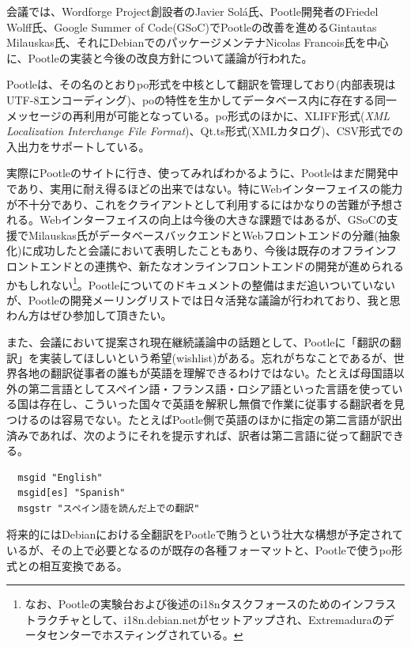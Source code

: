 \documentclass[mingoth,a4paper]{jsarticle}
\begin{document}
会議では、Wordforge Project創設者のJavier Sol\'{a}氏、Pootle開発者のFriedel Wolff氏、Google Summer of Code(GSoC)でPootleの改善を進めるGintautas Milauskas氏、それにDebianでのパッケージメンテナNicolas Francois氏を中心に、Pootleの実装と今後の改良方針について議論が行われた。

Pootleは、その名のとおりpo形式を中核として翻訳を管理しており(内部表現はUTF-8エンコーディング)、poの特性を生かしてデータベース内に存在する同一メッセージの再利用が可能となっている。po形式のほかに、XLIFF形式(\emph{XML Localization Interchange File Format})、Qt.ts形式(XMLカタログ)、CSV形式での入出力をサポートしている。

実際にPootleのサイトに行き、使ってみればわかるように、Pootleはまだ開発中であり、実用に耐え得るほどの出来ではない。特にWebインターフェイスの能力が不十分であり、これをクライアントとして利用するにはかなりの苦難が予想される。Webインターフェイスの向上は今後の大きな課題ではあるが、GSoCの支援でMilauskas氏がデータベースバックエンドとWebフロントエンドの分離(抽象化)に成功したと会議において表明したこともあり、今後は既存のオフラインフロントエンドとの連携や、新たなオンラインフロントエンドの開発が進められるかもしれない\footnote{なお、Pootleの実験台および後述のi18nタスクフォースのためのインフラストラクチャとして、i18n.debian.netがセットアップされ、Extremaduraのデータセンターでホスティングされている。}。Pootleについてのドキュメントの整備はまだ追いついていないが、Pootleの開発メーリングリストでは日々活発な議論が行われており、我と思わん方はぜひ参加して頂きたい。

また、会議において提案され現在継続議論中の話題として、Pootleに「翻訳の翻訳」を実装してほしいという希望(wishlist)がある。忘れがちなことであるが、世界各地の翻訳従事者の誰もが英語を理解できるわけではない。たとえば母国語以外の第二言語としてスペイン語・フランス語・ロシア語といった言語を使っている国は存在し、こういった国々で英語を解釈し無償で作業に従事する翻訳者を見つけるのは容易でない。たとえばPootle側で英語のほかに指定の第二言語が訳出済みであれば、次のようにそれを提示すれば、訳者は第二言語に従って翻訳できる。

\begin{screen}
\begin{verbatim}
  msgid "English"
  msgid[es] "Spanish"
  msgstr "スペイン語を読んだ上での翻訳"
\end{verbatim}
\end{screen}

将来的にはDebianにおける全翻訳をPootleで賄うという壮大な構想が予定されているが、その上で必要となるのが既存の各種フォーマットと、Pootleで使うpo形式との相互変換である。
\end{document}
